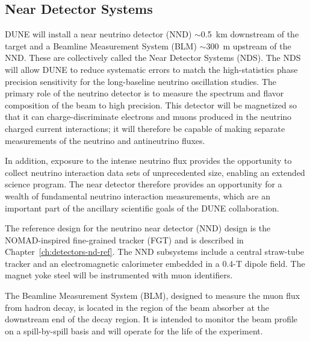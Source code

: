 \subsection{Near Detector Systems}
\label{sec:intro-dune-near-det}

DUNE will install a near neutrino detector (NND) $\sim$0.5~km
downstream of the target and a Beamline Measurement System (BLM)
$\sim$300~m upstream of the NND. These are collectively called the
Near Detector Systems (NDS).  The NDS will allow DUNE to reduce
systematic errors to match the high-statistics phase precision sensitivity
for the long-baseline neutrino oscillation studies.  The primary role
of the neutrino detector is to measure the spectrum and flavor
composition of the beam to high precision. This detector will be
magnetized so that it can charge-discriminate electrons and muons
produced in the neutrino charged current interactions; it will
therefore be capable of making separate measurements of the neutrino
and antineutrino fluxes.
%

In addition, exposure to the intense neutrino flux provides the
opportunity to collect neutrino interaction data sets of unprecedented
size, enabling an extended science program.  The near detector
therefore provides an opportunity for a wealth of fundamental neutrino
interaction measurements, which are an important part of the ancillary
scientific goals of the DUNE collaboration.

The reference design for the neutrino near detector (NND) design is
the NOMAD-inspired fine-grained tracker (FGT) and is described in
Chapter~\ref{ch:detectors-nd-ref}. The NND subsystems include a
central straw-tube tracker and an electromagnetic calorimeter embedded
in a 0.4-T dipole field. The magnet yoke steel will be instrumented
with muon identifiers.

The Beamline Measurement System (BLM), designed to measure the muon
flux from hadron decay, is located in the region of the beam absorber
at the downstream end of the decay region. It is intended to monitor
the beam profile on a spill-by-spill basis and will operate for the
life of the experiment.
